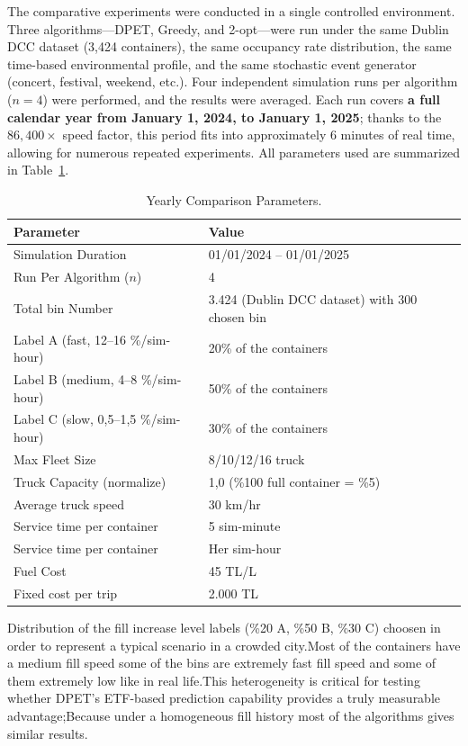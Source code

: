 \documentclass[12pt,a4paper]{report}
\begin{document}
\indent The comparative experiments were conducted in a single controlled environment. Three algorithms—DPET, Greedy, and 2-opt—were run under the same Dublin DCC dataset (3,424 containers), the same occupancy rate distribution, the same time-based environmental profile, and the same stochastic event generator (concert, festival, weekend, etc.). Four independent simulation runs per algorithm (\(n = 4\)) were performed, and the results were averaged. Each run covers \textbf{a full calendar year from January 1, 2024, to January 1, 2025}; thanks to the \(86,400\times\) speed factor, this period fits into approximately 6 minutes of real time, allowing for numerous repeated experiments. All parameters used are summarized in Table~\ref{tab:test_config}.

\begin{table}[H]
\centering
\caption{Yearly Comparison Parameters.}
\label{tab:test_config}
\begin{tabular}{ll}
\toprule
\textbf{Parameter} & \textbf{Value} \\
\midrule
Simulation Duration                            & 01/01/2024 -- 01/01/2025  \\
Run Per Algorithm (\(n\))        & 4 \\
Total bin Number                      & 3.424 (Dublin DCC dataset) with 300 chosen bin \\
Label A (fast, 12--16 \%/sim-hour) & 20\% of the containers \\
Label B (medium, 4--8 \%/sim-hour)    & 50\% of the containers\\
Label C (slow, 0,5--1,5 \%/sim-hour) & 30\% of the containers \\
Max Fleet Size                 & 8/10/12/16 truck \\
Truck Capacity (normalize)                 & 1,0 (\%100 full container = \%5) \\
Average truck speed                          & 30 km/hr \\
Service time per container                & 5 sim-minute \\
Service time per container                       & Her sim-hour \\
Fuel Cost                                  & 45 TL/L \\
Fixed cost per trip                    & 2.000 TL \\
\bottomrule
\end{tabular}
\end{table}

\indent Distribution of the fill increase level labels (\%20 A, \%50 B, \%30 C) choosen in order to represent a typical scenario in a crowded city.Most of the containers have a medium fill speed some of the bins are extremely fast fill speed and some of them extremely low like in real life.This heterogeneity is critical for testing whether DPET’s ETF-based prediction capability provides a truly measurable advantage;Because under a homogeneous fill history most of the algorithms gives similar results.
\end{document}
